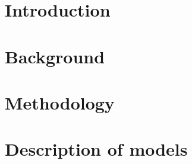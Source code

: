 

\raggedbottom %


\frontmatter	 %


\newpage
\clearpage

\newpage

\tableofcontents*												%

\mainmatter
%


\chapter{Introduction}


\chapter{Background} 




\chapter{Methodology}





\chapter{Description of models}


